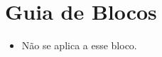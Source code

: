 \section{Guia de Blocos} %
\label{sec:guia_de_blocos}

\begin{itemize}
  \item Não se aplica a esse bloco.

\end{itemize}
